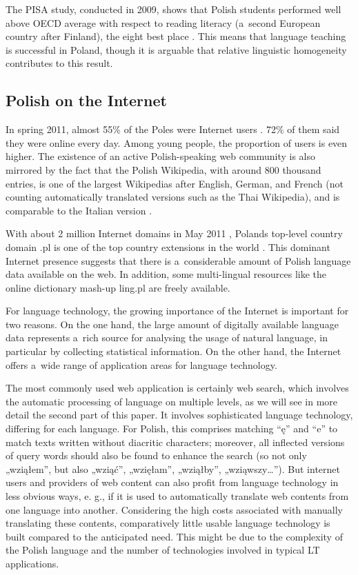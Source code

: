 \begin{multicols}{2}
The PISA study, conducted in 2009, shows that Polish students
performed well above OECD average with respect to reading literacy
(a~second European country after Finland), the eight best place
\cite{Oecd1}. This means that language teaching is successful in
Poland, though it is arguable that relative linguistic homogeneity
contributes to this result. 

\subsection{Polish on the Internet} 

In spring 2011, almost 55\% of the Poles were Internet users
\cite{Rp1}. 72\% of them said they were online every day. Among young
people, the proportion of users is even higher. The existence of an
active Polish-speaking web community is also mirrored by the fact that
the Polish Wikipedia, with around 800 thousand entries, is one of the
largest Wikipedias after English, German, and French (not counting
automatically translated versions such as the Thai Wikipedia), and is
comparable to the Italian version \cite{Wiki1}. 


With about 2 million Internet domains in May 2011 \cite{Krd1},
Poland{\textquotesingle}s top-level country domain .pl is one of the
top country extensions in the world \cite{ebrands1}. This dominant
Internet presence suggests that there is a~considerable amount of
Polish language data available on the web. In addition, some
multi-lingual resources like the online dictionary mash-up ling.pl
\cite{ling1} are freely available. 

For language technology, the growing importance of the Internet is
important for two reasons. On the one hand, the large amount of
digitally available language data represents a~rich source for
analysing the usage of natural language, in particular by collecting
statistical information. On the other hand, the Internet offers a~wide
range of application areas for language technology. 

The most commonly used web application is certainly web search, which
involves the automatic processing of language on multiple levels, as
we will see in more detail the second part of this paper. It involves
sophisticated language technology, differing for each language. For
Polish, this comprises matching “ę” and “e” to match texts
written without diacritic characters; moreover, all inflected versions
of query words should also be found to enhance the search (so not only
„wziąłem”, but also „wziąć”, „wzięłam”,
„wziąłby”, „wziąwszy…”). But internet users and providers
of web content can also profit from language technology in less
obvious ways, e. g., if it is used to automatically translate web
contents from one language into another. Considering the high costs
associated with manually translating these contents, comparatively
little usable language technology is built compared to the anticipated
need. This might be due to the complexity of the Polish language and
the number of technologies involved in typical LT applications. 


\end{multicols}
